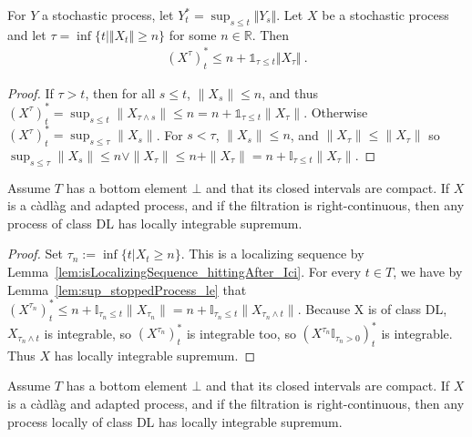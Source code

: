 \begin{lemma}\label{lem:sup_stoppedProcess_le}
  \leanok
For $Y$ a stochastic process, let $Y^*_t = \sup_{s \le t} \Vert Y_s \Vert$.
Let $X$ be a stochastic process and let $\tau = \inf \{t \mid \Vert X_t \Vert \ge n\}$ for some $n \in \mathbb{R}$.
Then
\begin{align*}
  (X^{\tau})^*_t
  \le n + \mathbb{1}_{\tau \le t} \Vert X_{\tau} \Vert
  \: .
\end{align*}
\end{lemma}

\begin{proof}
If $\tau > t$, then for all $s \le t$, $\|X_s\| \le n$, and thus $(X^\tau)^*_t = \sup_{s \le t} \|X_{\tau \land s}\| \le n = n + \mathbb{1}_{\tau \le t} \|X_{\tau}\|$. Otherwise $(X^\tau)^*_t = \sup_{s \le \tau} \|X_s\|$. For $s < \tau$, $\|X_s\| \le n$, and $\|X_\tau\| \le \|X_\tau\|$ so $\sup_{s \le \tau} \|X_s\| \le n \lor \|X_\tau\| \le n + \|X_\tau\| = n + \mathbb{I}_{\tau \le t} \|X_\tau\|$.
\end{proof}


\begin{lemma}\label{lem:ClassDL.hasLocallyIntegrableSup}
  \leanok
Assume $T$ has a bottom element $\bot$ and that its closed intervals are compact. If $X$ is a càdlàg and adapted process, and if the filtration is right-continuous, then any process of class DL has locally integrable supremum.
\end{lemma}

\begin{proof}\leanok
Set $\tau_n := \inf \{t | X_t \ge n\}$. This is a localizing sequence by Lemma~\ref{lem:isLocalizingSequence_hittingAfter_Ici}. For every $t \in T$, we have by Lemma~\ref{lem:sup_stoppedProcess_le} that $(X^{\tau_n})^*_t \le n + \mathbb{I}_{\tau_n \le t} \|X_{\tau_n}\| = n + \mathbb{I}_{\tau_n \le t} \|X_{\tau_n \land t}\|$. Because X is of class DL, $X_{\tau_n \land t}$ is integrable, so $(X^{\tau_n})^*_t$ is integrable too, so $(X^{\tau_n} \mathbb{I}_{\tau_n > 0})^*_t$ is integrable. Thus $X$ has locally integrable supremum.
\end{proof}


\begin{lemma}\label{lem:hasLocallyIntegrableSup_of_locally_classDL}
  \leanok
Assume $T$ has a bottom element $\bot$ and that its closed intervals are compact. If $X$ is a càdlàg and adapted process, and if the filtration is right-continuous, then any process locally of class DL has locally integrable supremum.
\end{lemma}

